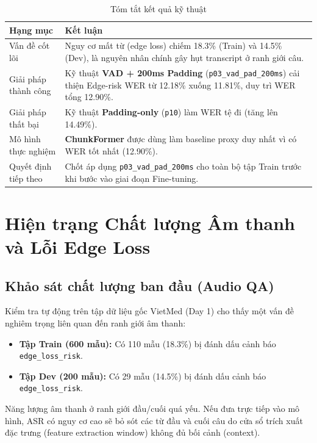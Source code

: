 \documentclass[12pt,a4paper]{article}
\begin{document}
\begin{table}[h]
\centering
\caption{Tóm tắt kết quả kỹ thuật}
\begin{tabularx}{\textwidth}{|l|X|}
\hline
\textbf{Hạng mục} & \textbf{Kết luận} \\
\hline
Vấn đề cốt lõi & Nguy cơ mất từ (edge loss) chiếm 18.3\% (Train) và 14.5\% (Dev), là nguyên nhân chính gây hụt transcript ở ranh giới câu. \\
\hline
Giải pháp thành công & Kỹ thuật \textbf{VAD + 200ms Padding} (\texttt{p03\_vad\_pad\_200ms}) cải thiện Edge-risk WER từ 12.18\% xuống 11.81\%, duy trì WER tổng 12.90\%. \\
\hline
Giải pháp thất bại & Kỹ thuật \textbf{Padding-only} (\texttt{p10}) làm WER tệ đi (tăng lên 14.49\%). \\
\hline
Mô hình thực nghiệm & \textbf{ChunkFormer} được dùng làm baseline proxy duy nhất vì có WER tốt nhất (12.90\%). \\
\hline
Quyết định tiếp theo & Chốt áp dụng \texttt{p03\_vad\_pad\_200ms} cho toàn bộ tập Train trước khi bước vào giai đoạn Fine-tuning. \\
\hline
\end{tabularx}
\end{table}

\section{Hiện trạng Chất lượng Âm thanh và Lỗi Edge Loss}

\subsection{Khảo sát chất lượng ban đầu (Audio QA)}
Kiểm tra tự động trên tập dữ liệu gốc VietMed (Day 1) cho thấy một vấn đề nghiêm trọng liên quan đến ranh giới âm thanh:
\begin{itemize}[leftmargin=1.2cm]
    \item \textbf{Tập Train (600 mẫu):} Có 110 mẫu (18.3\%) bị đánh dấu cảnh báo \texttt{edge\_loss\_risk}.
    \item \textbf{Tập Dev (200 mẫu):} Có 29 mẫu (14.5\%) bị đánh dấu cảnh báo \texttt{edge\_loss\_risk}.
\end{itemize}
Năng lượng âm thanh ở ranh giới đầu/cuối quá yếu. Nếu đưa trực tiếp vào mô hình, ASR có nguy cơ cao sẽ bỏ sót các từ đầu và cuối câu do cửa sổ trích xuất đặc trưng (feature extraction window) không đủ bối cảnh (context).
\end{document}
